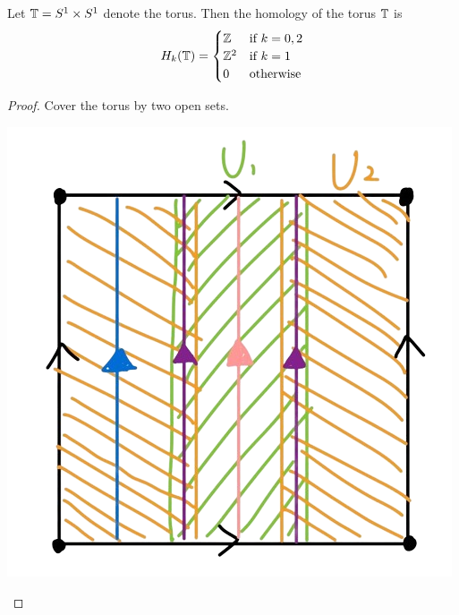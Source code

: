 \documentclass[a4paper]{article}
\begin{document}
\begin{eg}{}{} Let $\mathbb{T}=S^1\times S^1$ denote the torus. Then the homology of the torus $\mathbb{T}$ is $$H_k(\mathbb{T})=\begin{cases}
\mathbb{Z} & \text{if } k=0,2\\
\mathbb{Z}^2 & \text{if } k=1\\
0 & \text{otherwise}
\end{cases}$$ \tcbline
\begin{proof}
Cover the torus by two open sets. 

\begin{center}
\includegraphics[scale = 0.3]{Image 1}
\end{center}


\end{proof}
\end{eg}
\end{document}
